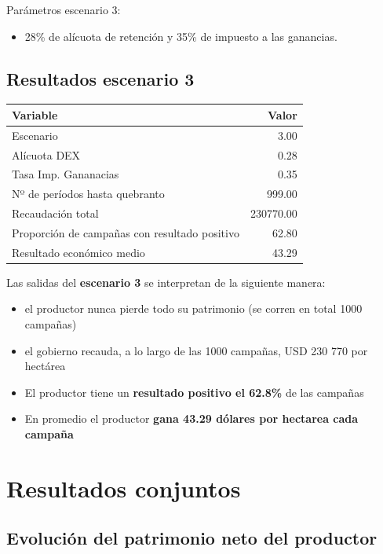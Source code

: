 \documentclass[
  12pt,
  spanish,
  10pt]{article}
\providecommand{\tightlist}{%
  \setlength{\itemsep}{0pt}\setlength{\parskip}{0pt}}
\begin{document}
Parámetros escenario 3:

\begin{itemize}
\tightlist
\item
  28\% de alícuota de retención y 35\% de impuesto a las ganancias.
\end{itemize}

\hypertarget{resultados-escenario-3}{%
\subsection{Resultados escenario 3}\label{resultados-escenario-3}}

\begin{longtable}[]{@{}lr@{}}
\toprule
Variable & Valor\tabularnewline
\midrule
\endhead
Escenario & 3.00\tabularnewline
Alícuota DEX & 0.28\tabularnewline
Tasa Imp. Gananacias & 0.35\tabularnewline
Nº de períodos hasta quebranto & 999.00\tabularnewline
Recaudación total & 230770.00\tabularnewline
Proporción de campañas con resultado positivo & 62.80\tabularnewline
Resultado económico medio & 43.29\tabularnewline
\bottomrule
\end{longtable}

Las salidas del \textbf{escenario 3} se interpretan de la siguiente
manera:

\begin{itemize}
\tightlist
\item
  el productor nunca pierde todo su patrimonio (se corren en total 1000
  campañas)
\item
  el gobierno recauda, a lo largo de las 1000 campañas, USD 230 770 por
  hectárea
\item
  El productor tiene un \textbf{resultado positivo el 62.8\%} de las
  campañas
\item
  En promedio el productor \textbf{gana 43.29 dólares por hectarea cada
  campaña}
\end{itemize}

\hypertarget{resultados-conjuntos}{%
\section{Resultados conjuntos}\label{resultados-conjuntos}}

\hypertarget{evoluciuxf3n-del-patrimonio-neto-del-productor}{%
\subsection{Evolución del patrimonio neto del
productor}\label{evoluciuxf3n-del-patrimonio-neto-del-productor}}
\end{document}
